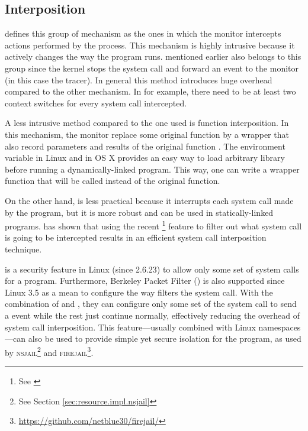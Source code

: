 \subsection{Interposition}

\citet{juvePracticalResourceMonitoring2015} defines this group of mechanism as the ones in which the monitor intercepts actions performed by the process.
This mechanism is highly intrusive because it actively changes the way the program runs.
 mentioned earlier also belongs to this group since the kernel stops the system call and forward an event to the monitor (in this case the tracer).
In general this method introduces huge overhead compared to the other mechanism.
In  for example, there need to be at least two context switches for every system call intercepted.

A less intrusive method compared to the one  used is function interposition.
In this mechanism, the monitor replace some original function by a wrapper that also record parameters and results of the original function \citep{juvePracticalResourceMonitoring2015}.
The environment variable  in Linux and  in OS X provides an easy way to load arbitrary library before running a dynamically-linked program.
This way, one can write a wrapper function that will be called instead of the original function.

On the other hand,  is less practical because it interrupts each system call made by the program, but it is more robust and can be used in statically-linked programs.
\citet{kimPracticalEffectiveSandboxing2013} has shown that using the recent \footnote{See \href{http://man7.org/linux/man-pages/man2/seccomp.2.html}{}} feature to filter out what system call is going to be intercepted results in an efficient system call interposition technique.

 is a security feature in Linux (since 2.6.23) to allow only some set of system calls for a program.
Furthermore, Berkeley Packet Filter () is also supported since Linux 3.5 as a mean to configure the way  filters the system call.
With the combination of  and , they can configure only some set of the system call to send a  event while the rest just continue normally, effectively reducing the overhead of system call interposition.
This feature---usually combined with Linux namespaces---can also be used to provide simple yet secure isolation for the program, as used by \textsc{nsjail}\footnote{See Section \ref{sec:resource.impl.nsjail}} and \textsc{firejail}\footnote{\href{https://github.com/netblue30/firejail/}{https://github.com/netblue30/firejail/}}.

